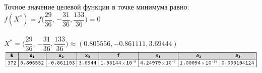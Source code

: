 \documentclass[14pt,a4paper,fleqn]{extarticle}
\begin{document}
	Точное значение целевой функции в точке минимума равно:\\
	
	$f(X^*) = f(\dfrac{29}{36}$, $-\dfrac{31}{36}, \dfrac{133}{36}) = 0$\\\\
	$X^* = (\dfrac{29}{36}$, $-\dfrac{31}{36}, \dfrac{133}{36}) \approx (0.805556, -0.861111, 3.69444)$\\
	
	\includegraphics[scale=0.5]{itog}
\end{document}
